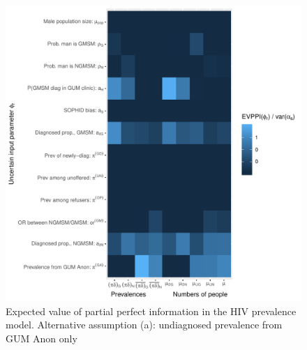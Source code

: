 \documentclass[12pt]{article}\usepackage[]{graphicx}\usepackage[]{color}
\makeatletter
\def\maxwidth{ %
  \ifdim\Gin@nat@width>\linewidth
    \linewidth
  \else
    \Gin@nat@width
  \fi
}
\newenvironment{knitrout}{}{} %
\makeatother
\begin{document}
\begin{figure}
\begin{knitrout}
\color{fgcolor}
\includegraphics[width=\maxwidth]{figure/evppi-nogu-1} 

\end{knitrout}
  \caption{Expected value of partial perfect information in the HIV prevalence model.  Alternative assumption (a): undiagnosed prevalence from GUM Anon only }
  \label{fig:res:evppi}
\end{figure}
\end{document}
